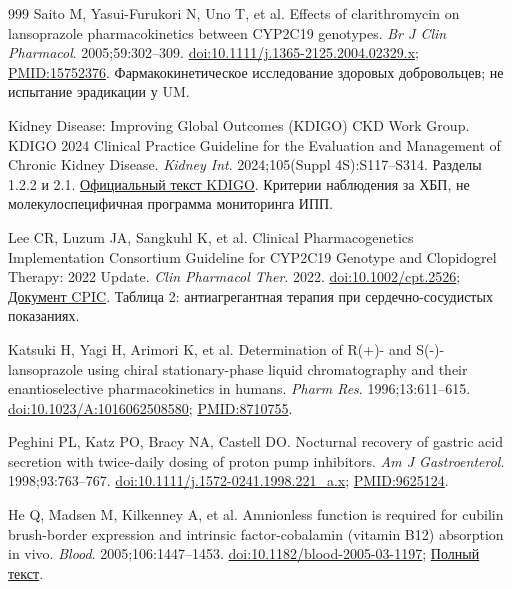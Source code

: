 \documentclass[11pt,a4paper,notitlepage]{report}
\begin{document}
\begin{thebibliography}{999}
 Saito M, Yasui-Furukori N, Uno T, et al. Effects of clarithromycin on lansoprazole pharmacokinetics between CYP2C19 genotypes. \textit{Br J Clin Pharmacol}. 2005;59:302--309. \href{https://doi.org/10.1111/j.1365-2125.2004.02329.x}{doi:10.1111/j.1365-2125.2004.02329.x}; \href{https://pubmed.ncbi.nlm.nih.gov/15752376/}{PMID:15752376}. Фармакокинетическое исследование здоровых добровольцев; не испытание эрадикации у UM.

 Kidney Disease: Improving Global Outcomes (KDIGO) CKD Work Group. KDIGO 2024 Clinical Practice Guideline for the Evaluation and Management of Chronic Kidney Disease. \textit{Kidney Int}. 2024;105(Suppl 4S):S117--S314. Разделы 1.2.2 и 2.1. \href{https://kdigo.org/wp-content/uploads/2024/03/KDIGO-2024-CKD-Guideline.pdf}{Официальный текст KDIGO}. Критерии наблюдения за ХБП, не молекулоспецифичная программа мониторинга ИПП.

 Lee CR, Luzum JA, Sangkuhl K, et al. Clinical Pharmacogenetics Implementation Consortium Guideline for CYP2C19 Genotype and Clopidogrel Therapy: 2022 Update. \textit{Clin Pharmacol Ther}. 2022. \href{https://doi.org/10.1002/cpt.2526}{doi:10.1002/cpt.2526}; \href{https://files.cpicpgx.org/data/guideline/publication/clopidogrel/2022/35034351.pdf}{Документ CPIC}. Таблица 2: антиагрегантная терапия при сердечно-сосудистых показаниях.

 Katsuki H, Yagi H, Arimori K, et al. Determination of R(+)- and S(-)-lansoprazole using chiral stationary-phase liquid chromatography and their enantioselective pharmacokinetics in humans. \textit{Pharm Res}. 1996;13:611--615. \href{https://doi.org/10.1023/A:1016062508580}{doi:10.1023/A:1016062508580}; \href{https://pubmed.ncbi.nlm.nih.gov/8710755/}{PMID:8710755}.

 Peghini PL, Katz PO, Bracy NA, Castell DO. Nocturnal recovery of gastric acid secretion with twice-daily dosing of proton pump inhibitors. \textit{Am J Gastroenterol}. 1998;93:763--767. \href{https://doi.org/10.1111/j.1572-0241.1998.221_a.x}{doi:10.1111/j.1572-0241.1998.221\_a.x}; \href{https://pubmed.ncbi.nlm.nih.gov/9625124/}{PMID:9625124}.

 He Q, Madsen M, Kilkenney A, et al. Amnionless function is required for cubilin brush-border expression and intrinsic factor-cobalamin (vitamin B12) absorption in vivo. \textit{Blood}. 2005;106:1447--1453. \href{https://doi.org/10.1182/blood-2005-03-1197}{doi:10.1182/blood-2005-03-1197}; \href{https://pmc.ncbi.nlm.nih.gov/articles/PMC1895201/}{Полный текст}.


\end{thebibliography}
\end{document}
